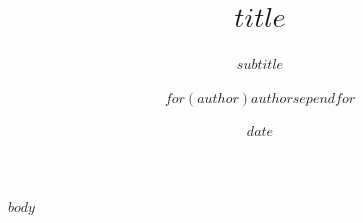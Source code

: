 \documentclass[aspectratio=$aspectratio$,11pt,fontset=none,t,xcolor=dvipsnames]{ctexbeamer}
\title[$if(short_title)$$short_title$$else$$title$$endif$]{$title$}
\subtitle{$subtitle$}
\author[$if(short_author)$$short_author$$else$$for(author)$$author$$sep$, $endfor$$endif$]{$for(author)$$author$$sep$\quad\allowbreak $endfor$}
\institute[$if(school_name)$$school_name$$if(institute)$ · $institute$$endif$$else$$institute$$endif$]{$if(institute)$$institute$$else$$if(school_name)$$school_name$$endif$$endif$}
\date{$date$}
\begin{document}
\ExperimentTitle
$body$
\end{document}
